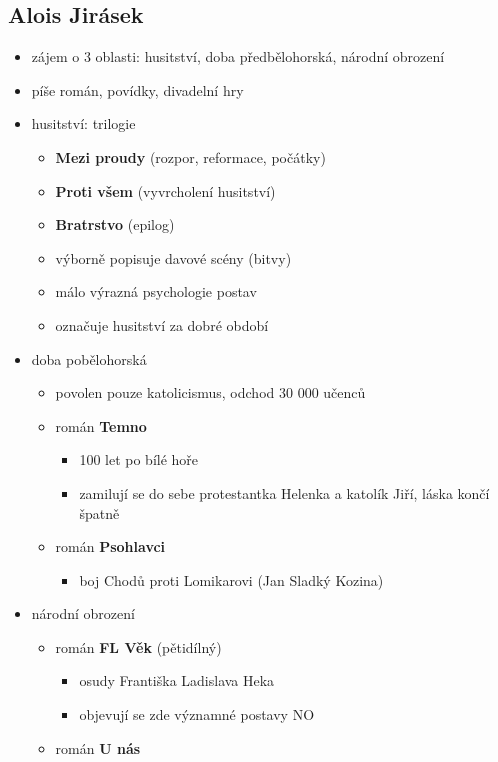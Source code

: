 \subsection{Alois Jirásek}
\begin{itemize}
\item zájem o 3 oblasti: husitství, doba předbělohorská, národní obrození
\item píše román, povídky, divadelní hry
\item husitství: trilogie 
	\begin{itemize}
	\item \textbf{Mezi proudy} (rozpor, reformace, počátky)
	\item \textbf{Proti všem} (vyvrcholení husitství)
	\item \textbf{Bratrstvo} (epilog)
	\item výborně popisuje davové scény (bitvy)
	\item málo výrazná psychologie postav
	\item označuje husitství za dobré období
	\end{itemize}
\item doba pobělohorská
	\begin{itemize}
	\item povolen pouze katolicismus, odchod 30 000 učenců
	\item román \textbf{Temno}
		\begin{itemize}
		\item 100 let po bílé hoře
		\item zamilují se do sebe protestantka Helenka a katolík Jiří, láska končí špatně
		\end{itemize}
	\item román \textbf{Psohlavci}
		\begin{itemize}
		\item boj Chodů proti Lomikarovi (Jan Sladký Kozina)
		\end{itemize}
	\end{itemize}
\item národní obrození
	\begin{itemize}
	\item román \textbf{FL Věk} (pětidílný)
		\begin{itemize}
		\item osudy Františka Ladislava Heka
		\item objevují se zde významné postavy NO
		\end{itemize}
	\item román \textbf{U nás}

\end{itemize}
\end{itemize}
